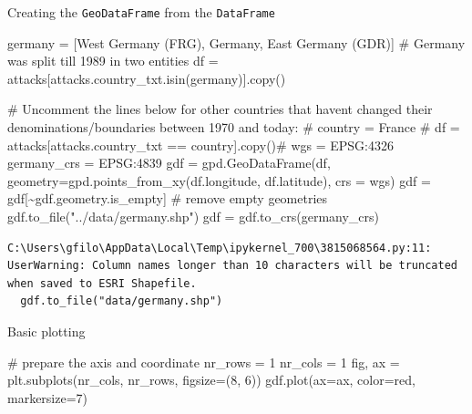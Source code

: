 \documentclass[
  letterpaper,
  DIV=11,
  numbers=noendperiod]{scrreprt}
\newenvironment{Shaded}{\begin{snugshade}}{\end{snugshade}}
\newcommand{\CommentTok}[1]{\textcolor[rgb]{0.37,0.37,0.37}{#1}}
\newcommand{\DecValTok}[1]{\textcolor[rgb]{0.68,0.00,0.00}{#1}}
\newcommand{\NormalTok}[1]{\textcolor[rgb]{0.00,0.23,0.31}{#1}}
\newcommand{\OperatorTok}[1]{\textcolor[rgb]{0.37,0.37,0.37}{#1}}
\newcommand{\StringTok}[1]{\textcolor[rgb]{0.13,0.47,0.30}{#1}}
\begin{document}
Creating the \texttt{GeoDataFrame} from the \texttt{DataFrame}

\begin{Shaded}
\begin{Highlighting}[]
\NormalTok{germany }\OperatorTok{=}\NormalTok{ [}\StringTok{\textquotesingle{}West Germany (FRG)\textquotesingle{}}\NormalTok{, }\StringTok{\textquotesingle{}Germany\textquotesingle{}}\NormalTok{, }\StringTok{\textquotesingle{}East Germany (GDR)\textquotesingle{}}\NormalTok{] }\CommentTok{\# Germany was split till 1989 in two entities}
\NormalTok{df }\OperatorTok{=}\NormalTok{ attacks[attacks.country\_txt.isin(germany)].copy()}

\CommentTok{\# Uncomment the lines below for other countries that haven\textquotesingle{}t changed their denominations/boundaries between 1970 and today:}
\CommentTok{\# country = \textquotesingle{}France\textquotesingle{} }
\CommentTok{\# df = attacks[attacks.country\_txt == country].copy()\#}
\NormalTok{wgs }\OperatorTok{=} \StringTok{\textquotesingle{}EPSG:4326\textquotesingle{}}
\NormalTok{germany\_crs }\OperatorTok{=} \StringTok{\textquotesingle{}EPSG:4839\textquotesingle{}}
\NormalTok{gdf }\OperatorTok{=}\NormalTok{ gpd.GeoDataFrame(df, geometry}\OperatorTok{=}\NormalTok{gpd.points\_from\_xy(df.longitude, df.latitude), crs }\OperatorTok{=}\NormalTok{ wgs)}
\NormalTok{gdf }\OperatorTok{=}\NormalTok{ gdf[}\OperatorTok{\textasciitilde{}}\NormalTok{gdf.geometry.is\_empty] }\CommentTok{\# remove empty geometries}
\NormalTok{gdf.to\_file(}\StringTok{"../data/germany.shp"}\NormalTok{)}
\NormalTok{gdf }\OperatorTok{=}\NormalTok{ gdf.to\_crs(germany\_crs)}
\end{Highlighting}
\end{Shaded}

\begin{verbatim}
C:\Users\gfilo\AppData\Local\Temp\ipykernel_700\3815068564.py:11: UserWarning: Column names longer than 10 characters will be truncated when saved to ESRI Shapefile.
  gdf.to_file("data/germany.shp")
\end{verbatim}

Basic plotting

\begin{Shaded}
\begin{Highlighting}[]
\CommentTok{\# prepare the axis and coordinate}
\NormalTok{nr\_rows }\OperatorTok{=} \DecValTok{1}
\NormalTok{nr\_cols }\OperatorTok{=} \DecValTok{1}
\NormalTok{fig, ax }\OperatorTok{=}\NormalTok{ plt.subplots(nr\_cols, nr\_rows, figsize}\OperatorTok{=}\NormalTok{(}\DecValTok{8}\NormalTok{, }\DecValTok{6}\NormalTok{))}
\NormalTok{gdf.plot(ax}\OperatorTok{=}\NormalTok{ax, color}\OperatorTok{=}\StringTok{\textquotesingle{}red\textquotesingle{}}\NormalTok{, markersize}\OperatorTok{=}\DecValTok{7}\NormalTok{)}
\end{Highlighting}
\end{Shaded}
\end{document}
